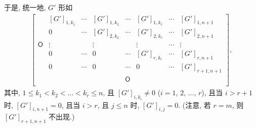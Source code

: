 \documentclass[../libro.tex]{subfiles}
\begin{document}
于是, 统一地, \(G'\) 形如
\begin{align*}
    \begin{bmatrix}
        {}         & [G']_{1,k_1} & \cdots & [G']_{1,k_2} & \cdots     & [G']_{1,k_r} & \cdots & [G']_{1,n+1}   \\
        {}         & 0            & \cdots & [G']_{2,k_2} & \cdots     & [G']_{2,k_r} & \cdots & [G']_{2,n+1}   \\
        \mathsf{O} & \vdots       & {}     & \vdots       & {}         & \vdots       & \cdots & \vdots         \\
        {}         & 0            & \cdots & 0            & \cdots     & [G']_{r,k_r} & \cdots & [G']_{r,n+1}   \\
        {}         & 0            & \cdots & 0            & \cdots     & 0            & \cdots & [G']_{r+1,n+1} \\
        {}         & {}           & {}     & {}           & \mathsf{O} & {}           & {}     & {}             \\
    \end{bmatrix},
\end{align*}
其中,
\(1 \leq k_1 < k_2 < \dots < k_r \leq n\),
且 \([G']_{i,k_i} \neq 0\)
(\(i = 1\), \(2\), \(\dots\), \(r\)),
且当 \(i > r + 1\) 时, \([G']_{i,n+1} = 0\),
且当 \(i > r\), 且 \(j \leq n\) 时,
\([G']_{i,j} = 0\).
(注意, 若 \(r = m\), 则 \([G']_{r+1,n+1}\) 不出现.)
\end{document}

